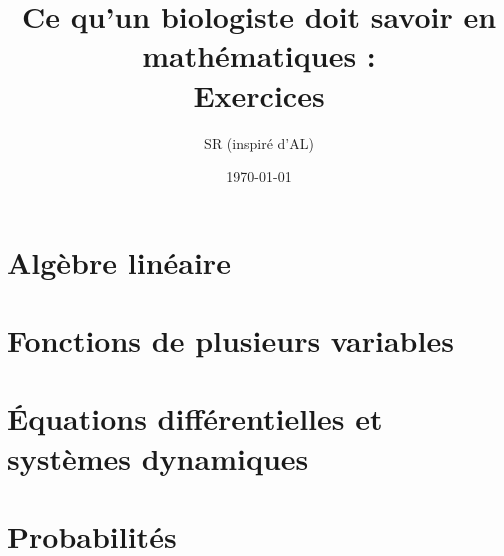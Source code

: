 \documentclass[french, 12pt]{article}
\title{{Ce qu'un biologiste doit savoir en mathématiques : \\ Exercices}}
\author{SR (inspiré d'AL)}
\date{\today}
\numberwithin{exercise}{subsection}
\numberwithin{equation}{section}
\begin{document}

\maketitle
\tableofcontents

\newpage \section{Algèbre linéaire} 

\newpage \section{Fonctions de plusieurs variables} 

\newpage \section{\'Equations différentielles et systèmes dynamiques} 

\newpage \section{Probabilités} 

% 
% 

\end{document}
